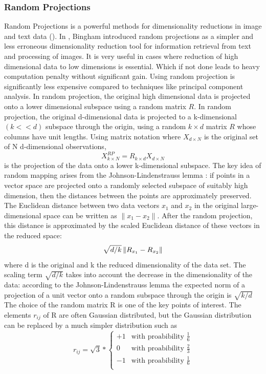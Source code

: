 \subsubsection{Random Projections}
Random Projections is a powerful methods for dimensionality reductions in image and text data (\citet*{randproj}).  
In \citet*{rpCite}, Bingham introduced random projections as a simpler and less erroneous dimensionality reduction tool for 
information retrieval from text and processing of images. It is very useful in cases where reduction of high 
dimensional data to low dimensions is essential. Which if not done leads to heavy computation penalty without significant gain. 
Using random projection is significantly less expensive compared to techniques like principal component analysis. In random projection, 
the original high dimensional data is projected onto a lower dimensional subspace using a random matrix $R$. 
In random projection, the original d-dimensional data is projected to a k-dimensional $(k << d)$ subspace through the origin, using a 
random $k \times d$ matrix $R$ whose columns have unit lengths. Using matrix notation where $X_{d\times N} $ is the original set of 
N d-dimensional observations,
$$ X^{RP}_{k\times N} = R_{k\times d} X_{d\times N} $$
is the projection of the data onto a lower k-dimensional subspace. The key idea of random mapping arises from the Johnson-Lindenstrauss 
lemma \citep{lemma}: if points in a vector space are projected onto a randomly selected subspace of suitably high dimension, then the 
distances between the points are approximately preserved.  The Euclidean distance between two data vectors $x_1$ and 
$x_2$ in the original large-dimensional space can be written as $\lVert x_1 - x_2 \rVert$. After the random projection, this 
distance is approximated by the scaled Euclidean distance of these vectors in the reduced space:
$$\sqrt{ d/k} \left\lVert R_{x_1} - R_{x_2} \right\rVert$$
where d is the original and k the reduced dimensionality of the data set. The scaling term $\sqrt{d/k}$ takes into account the decrease 
in the dimensionality of the data: according to the Johnson-Lindenstrauss lemma \citep{lemma} the expected norm of a projection 
of a unit vector onto a random subspace through the origin is $\sqrt{k/d}$ The choice of the random matrix R is one of the key points of 
interest. The elements $r_{ij}$ of R are often Gaussian distributed, but the Gaussian distribution can be replaced by a much simpler 
distribution such as
\[
	r_{ij} = \sqrt{3}*\begin{cases} 
	 +1 & \textrm{with proabibility $\frac{1}{6}$} \\
	 0 & \textrm{with proabibility $\frac{2}{3}$}\\
	-1 & \textrm{with proabibility $\frac{1}{6}$} \\
		\end{cases}
\]
